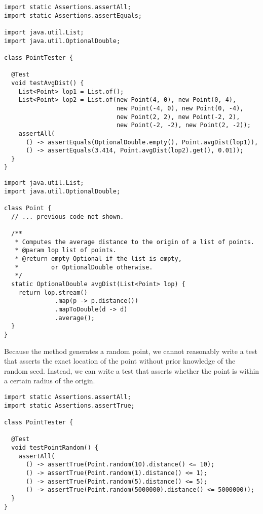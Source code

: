 \begin{lstlisting}[language=MyJava]
import static Assertions.assertAll;
import static Assertions.assertEquals;

import java.util.List;
import java.util.OptionalDouble;

class PointTester {

  @Test
  void testAvgDist() {
    List<Point> lop1 = List.of();
    List<Point> lop2 = List.of(new Point(4, 0), new Point(0, 4),
                               new Point(-4, 0), new Point(0, -4),
                               new Point(2, 2), new Point(-2, 2),
                               new Point(-2, -2), new Point(2, -2));
    assertAll(
      () -> assertEquals(OptionalDouble.empty(), Point.avgDist(lop1)),
      () -> assertEquals(3.414, Point.avgDist(lop2).get(), 0.01));
  }
}
\end{lstlisting}

\begin{lstlisting}[language=MyJava]
import java.util.List;
import java.util.OptionalDouble;

class Point {
  // ... previous code not shown. 

  /**
   * Computes the average distance to the origin of a list of points.
   * @param lop list of points.
   * @return empty Optional if the list is empty, 
   *         or OptionalDouble otherwise.
   */
  static OptionalDouble avgDist(List<Point> lop) {
    return lop.stream()
              .map(p -> p.distance())
              .mapToDouble(d -> d)
              .average();
  }
}
\end{lstlisting}


Because the  method generates a random point, we cannot reasonably write a test that asserts the exact location of the point without prior knowledge of the random seed. 
Instead, we can write a test that asserts whether the point is within a certain radius of the origin. 

\enlargethispage{-2\baselineskip}
\begin{lstlisting}[language=MyJava]
import static Assertions.assertAll;
import static Assertions.assertTrue;

class PointTester {

  @Test
  void testPointRandom() {
    assertAll(
      () -> assertTrue(Point.random(10).distance() <= 10);
      () -> assertTrue(Point.random(1).distance() <= 1);
      () -> assertTrue(Point.random(5).distance() <= 5);
      () -> assertTrue(Point.random(5000000).distance() <= 5000000));
  }
}
\end{lstlisting}


